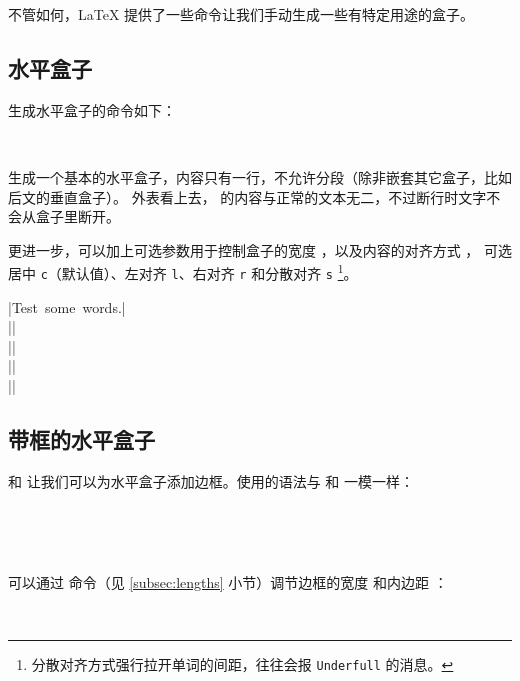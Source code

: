 不管如何，\LaTeX{} 提供了一些命令让我们手动生成一些有特定用途的盒子。

\subsection{水平盒子}\label{subsec:mbox}

生成水平盒子的命令如下：
\begin{command}
\marg*{\ldots} \\
\marg*{\ldots}
\end{command}

 生成一个基本的水平盒子，内容只有一行，不允许分段（除非嵌套其它盒子，比如后文的垂直盒子）。
外表看上去， 的内容与正常的文本无二，不过断行时文字不会从盒子里断开。

 更进一步，可以加上可选参数用于控制盒子的宽度 ，以及内容的对齐方式 ，
可选居中 \texttt{c}（默认值）、左对齐 \texttt{l}、右对齐 \texttt{r} 和分散对齐 \texttt{s}%
\footnote{分散对齐方式强行拉开单词的间距，往往会报 \texttt{Underfull}  的消息。}。
\begin{example}
|\mbox{Test some words.}|\\
||\\
||\\
||\\
||
\end{example}

\subsection{带框的水平盒子}\label{subsec:fbox}

 和  让我们可以为水平盒子添加边框。使用的语法与  和  一模一样：
\begin{command}
\marg*{\ldots} \\
\marg*{\ldots}
\end{command}
\begin{example}
\\
\end{example}

可以通过  命令（见 \ref{subsec:lengths} 小节）调节边框的宽度  和内边距 ：
\begin{example}
\\[1ex]
\setlength{\fboxrule}{1.6pt}
\setlength{\fboxsep}{1em}
\end{example}

